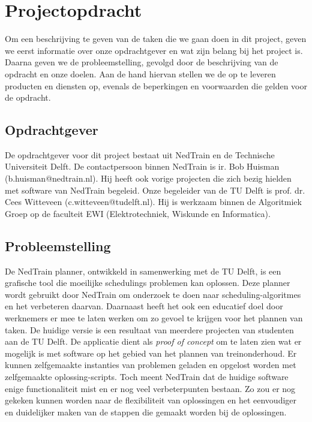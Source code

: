 \section{Projectopdracht}
Om een beschrijving te geven van de taken die we gaan doen in dit project, geven we eerst informatie over onze opdrachtgever en wat zijn belang bij het project is. Daarna geven we de probleemstelling, gevolgd door de beschrijving van de opdracht en onze doelen. Aan de hand hiervan stellen we de op te leveren producten en diensten op, evenals de beperkingen en voorwaarden die gelden voor de opdracht.

\subsection{Opdrachtgever}
De opdrachtgever voor dit project bestaat uit NedTrain en de Technische Universiteit Delft.
De contactpersoon binnen NedTrain is ir. Bob Huisman (b.huisman@nedtrain.nl). Hij heeft ook vorige projecten die zich bezig hielden met software van NedTrain begeleid. Onze begeleider van de TU Delft is prof. dr. Cees Witteveen (c.witteveen@tudelft.nl). Hij is werkzaam binnen de Algoritmiek Groep op de faculteit EWI (Elektrotechniek, Wiskunde en Informatica).

\subsection{Probleemstelling}
De NedTrain planner, ontwikkeld in samenwerking met de TU Delft, is een grafische tool die moeilijke schedulings problemen kan oplossen. Deze planner wordt gebruikt door NedTrain om onderzoek te doen naar scheduling-algoritmes en het verbeteren daarvan. Daarnaast heeft het ook een educatief doel door werknemers er mee te laten werken om zo gevoel te krijgen voor het plannen van taken. De huidige versie is een resultaat van meerdere projecten van studenten aan de TU Delft. De applicatie dient als \emph{proof of concept} om te laten zien wat er mogelijk is met software op het gebied van het plannen van treinonderhoud. Er kunnen zelfgemaakte instanties van problemen geladen en opgelost worden met zelfgemaakte oplossing-scripts. Toch meent NedTrain dat de huidige software enige functionaliteit mist en er nog veel verbeterpunten bestaan. Zo zou er nog gekeken kunnen worden naar de flexibiliteit van oplossingen en het eenvoudiger en duidelijker maken van de stappen die gemaakt worden bij de oplossingen. 

